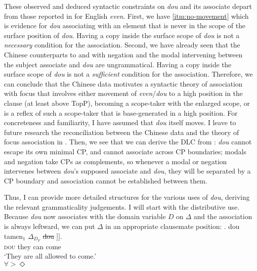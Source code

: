 \documentclass[12pt]{article}
\let\latextextsubscript\textsubscript
\let\textsubscript\latextextsubscript
\newcommand{\gap}[1]{\rule{1em}{0.4pt}\textsubscript{#1}}
\begin{document}
These observed and deduced syntactic constraints on \emph{dou} and its associate depart from those reported in \citet{erlewineMovementOutFocus2014a} for English \emph{even}.
First, we have \cref{itm:no-movement} which is evidence for \emph{dou} associating with an element that is never in the scope of the surface position of \emph{dou}.
Having a copy inside the surface scope of \emph{dou} is not a \emph{necessary} condition for the association.
Second, we have already seen that the Chinese counterparts to \Last and \LLast with negation and the modal intervening between the subject associate and \emph{dou} are ungrammatical.
Having a copy inside the surface scope of \emph{dou} is not a \emph{sufficient} condition for the association.
Therefore, we can conclude that the Chinese data motivates a syntactic theory of association with focus that involves either movement of \emph{even}/\emph{dou} to a high position in the clause (at least above TopP), becoming a scope-taker with the enlarged scope, or is a reflex of such a scope-taker that is base-generated in a high position.
For concreteness and familiarity, I have assumed that \emph{dou} itself moves.
I leave to future research the reconciliation between the Chinese data and the theory of focus association in \citet{erlewineMovementOutFocus2014a}.
Then, we see that we can derive the DLC from : \emph{dou} cannot escape its own minimal CP, and cannot associate across CP boundaries; modals and negation take CPs as complements, so whenever a modal or negation intervenes between \emph{dou}'s supposed associate and \emph{dou}, they will be separated by a CP boundary and association cannot be established between them.

Thus, I can provide more detailed structures for the various uses of \emph{dou}, deriving the relevant grammaticality judgements.
I will start with the distributive use.
Because \emph{dou} now associates with the domain variable \(D\) on \(\Delta\) and the association is always leftward, we can put \(\Delta\) in an appropriate clausemate position:
\ex. \gll
dou tamen\(_1\) \(\Delta_{D_F}\) \sout{dou} \I[VP keyi \I[CP \gap{1} \I[VP lai ]]]. \\
\textsc{dou} they {} {} {} can {} {} {} come \\
\glt `They are all allowed to come.'\\
\(\forall > \Diamond\)
\end{document}
